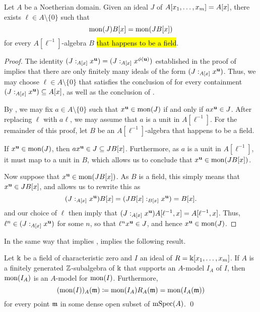 \documentclass{amsart}
\begin{document}
\begin{theorem}
\label{mon-operation-general-expansion: T}
Let $A$ be a Noetherian domain.  Given an ideal $J$ of $A[x_1, \ldots, x_m] = A[x]$, there exists $\ell \in A \setminus \{0\}$ such that 
\[ \operatorname{mon}(J) B[x] = \operatorname{mon}(JB[x])\]
for every $A[\ell^{-1}]$-algebra $B$ \hl{that happens to be a field}.
\end{theorem}


\begin{proof}
   The identity $(J:_{A[x]} x^{\mathbf{u}}) = (J:_{A[x]} x^{\phi(\mathbf{u})})$ established in the proof of  implies that there are only finitely many ideals of the form $(J:_{A[x]} x^{\mathbf{u}})$.
   Thus, we may choose $\ell \in A\setminus \{0\}$ that satisfies the conclusion of  for every containment $(J:_{A[x]} x^{\mathbf{u}}) \subseteq A[x]$, as well as the conclusion of .

   By , we may fix $a \in A \setminus \{0\}$ such that $x^{\mathbf{u}} \in \operatorname{mon}(J)$ if and only if $ax^{\mathbf{u}} \in J$.
   After replacing $\ell$ with $a \ell$, we may assume that $a$ is a unit in $A[\ell^{-1}]$.
   For the remainder of this proof, let $B$ be an $A[\ell^{-1}]$-algebra that happens to be a field.

   If $x^{\mathbf{u}} \in \operatorname{mon}(J)$, then $a x^{\mathbf{u}} \in J \subseteq JB[x]$.
   Furthermore, as $a$ is a unit in $A[\ell^{-1}]$, it must map to a unit in $B$, which allows us to conclude that $x^{\mathbf{u}} \in \operatorname{mon}(JB[x])$.

   Now suppose that $x^{\mathbf{u}} \in \operatorname{mon}(JB[x])$.
   As $B$ is a field, this simply means that $x^{\mathbf{u}} \in JB[x]$, and  allows us to rewrite this as
   \[(J:_{A[x]} x^{\mathbf{u}}) B[x] = (JB[x] :_{B[x]} x^{\mathbf{u}}) = B[x].\]
    and our choice of $\ell$ then imply that $(J:_{A[x]} x^{\mathbf{u}}) A[\ell^{-1},x] = A[\ell^{-1},x]$.
   Thus, $\ell^n \in (J:_{A[x]} x^{\mathbf{u}})$ for some $n$, so that $\ell^n x^{\mathbf{u}} \in J$, and hence $x^{\mathbf{u}} \in \operatorname{mon}(J)$.
\end{proof}

In the same way that  implies ,  implies the following result.

\begin{theorem}
   \label{mon-operation-modulo-p: T}
   Let $\Bbbk$ be a field of characteristic zero and $I$ an ideal of $R=\Bbbk[x_1, \ldots, x_{m}]$.
   If $A$ is a finitely generated $\mathbb{Z}$-subalgebra of $\Bbbk$ that supports an $A$-model $I_A$ of $I$, then $\operatorname{mon}(I_A)$ is an $A$-model for $\operatorname{mon}(I)$.
   Furthermore, 
\[ (\operatorname{mon}(I))_A(\mathfrak{m}) \coloneqq \operatorname{mon}(I_A) R_A(\mathfrak{m}) = \operatorname{mon}(I_A(\mathfrak{m})) \] for every point $\mathfrak{m}$ in some dense open subset of $\operatorname{mSpec}(A)$. \qed
\end{theorem}
\end{document}
